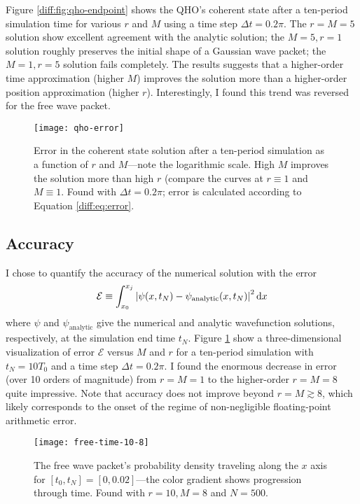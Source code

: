 \documentclass[11pt, a4paper]{article}
\newcommand{\diff}{\mathop{}\!\mathrm{d}} %
\begin{document}
Figure \ref{diff:fig:qho-endpoint} shows the QHO's coherent state after a ten-period simulation time for various $ r $ and $ M $ using a time step $ \Delta t = 0.2 \pi $. The $ r = M = 5 $ solution show excellent agreement with the analytic solution; the $ M = 5, r = 1 $ solution roughly preserves the initial shape of a Gaussian wave packet; the $ M = 1, r = 5 $ solution fails completely. The results suggests that a higher-order time approximation (higher $ M $) improves the solution more than a higher-order position approximation (higher $ r $). Interestingly, I found this trend was reversed for the free wave packet.


\begin{figure}[htb!]
\centering
\texttt{[image: qho-error]}
\caption{Error in the coherent state solution after a ten-period simulation as a function of $ r $ and $ M $---note the logarithmic scale. High $ M $ improves the solution more than high $ r $ (compare the curves at $ r \equiv 1$ and $ M \equiv 1 $. Found with $ \Delta t = 0.2\pi $; error is calculated according to Equation \ref{diff:eq:error}.}
\label{diff:fig:qho-error}
\end{figure}

\subsection{Accuracy}
I chose to quantify the accuracy of the numerical solution with the error
\begin{equation}
	\mathcal{E} \equiv \int_{x_{0}}^{x_{j}} \abs{\psi(x, t_{N}) - \psi_{\text{analytic}}(x, t_{N})}^{2} \diff x \label{diff:eq:error}
\end{equation}
where $ \psi $ and $ \psi_{\text{analytic}} $ give the numerical and analytic wavefunction solutions, respectively, at the simulation end time $ t_{N} $. Figure \ref{diff:fig:qho-error} show a three-dimensional visualization of error $ \mathcal{E} $ versus $ M $ and $ r $ for a ten-period simulation with $ t_{N} = 10 T_{0} $ and a time step $ \Delta t = 0.2 \pi $. I found the enormous decrease in error (over 10 orders of magnitude) from $ r = M = 1 $ to the higher-order $ r = M = 8 $ quite impressive. Note that accuracy does not improve beyond $ r = M \gtrsim 8 $, which likely corresponds to the onset of the regime of non-negligible floating-point arithmetic error.

\begin{figure}[htb!]
\centering
\texttt{[image: free-time-10-8]}
\caption{The free wave packet's probability density traveling along the $ x $ axis for $ [t_{0}, t_{N}] = [0, 0.02] $---the color gradient shows progression through time. Found with $ r = 10, M = 8 $ and $ N = 500 $.}
\label{diff:fig:free-time}
\end{figure}
\end{document}
